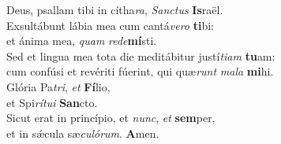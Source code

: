 \oddverse Deus, psallam tibi in cítha\textit{ra}, \textit{San}\textit{ctus} \textbf{Is}raël.\\
\evenverse Exsultábunt lábia mea cum cantá\textit{ve}\textit{ro} \textbf{ti}bi:~\*\\
\evenverse et ánima mea, \textit{quam} \textit{re}\textit{de}\textbf{mí}sti.\\
\oddverse Sed et lingua mea tota die meditábitur justí\textit{ti}\textit{am} \textbf{tu}am:~\*\\
\oddverse cum confúsi et revériti fúerint, qui quæ\textit{runt} \textit{ma}\textit{la} \textbf{mi}hi.\\
\evenverse Glória Pa\textit{tri}, \textit{et} \textbf{Fí}lio,~\*\\
\evenverse et Spi\textit{rí}\textit{tu}\textit{i} \textbf{San}cto.\\
\oddverse Sicut erat in princípio, et \textit{nunc}, \textit{et} \textbf{sem}per,~\*\\
\oddverse et in sǽcula sæ\textit{cu}\textit{ló}\textit{rum}. \textbf{A}men.\\
